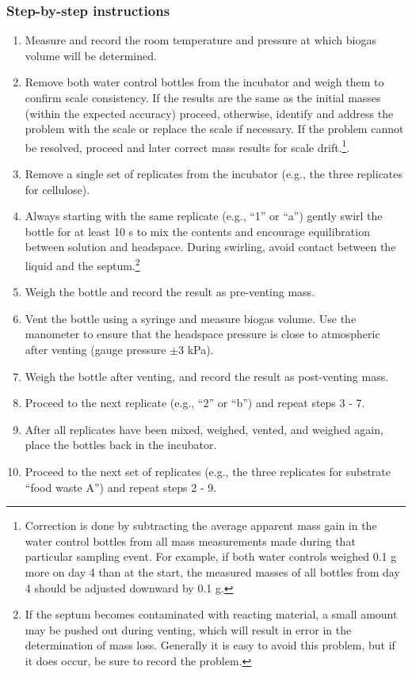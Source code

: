 \documentclass[]{article}
\begin{document}
\subsubsection{Step-by-step instructions}
\begin{enumerate}
    \item Measure and record the room temperature and pressure at which biogas volume will be determined.
    \item Remove both water control bottles from the incubator and weigh them to confirm scale consistency. 
      If the results are the same as the initial masses (within the expected accuracy) proceed, otherwise, identify and address the problem with the scale or replace the scale if necessary.
      If the problem cannot be resolved, proceed and later correct mass results for scale drift.\footnote{
        Correction is done by subtracting the average apparent mass gain in the water control bottles from all mass measurements made during that particular sampling event. 
        For example, if both water controls weighed 0.1 g more on day 4 than at the start, the measured masses of all bottles from day 4 should be adjusted downward by 0.1 g.
      }.
    \item Remove a single set of replicates from the incubator (e.g., the three replicates for cellulose).
    \item Always starting with the same replicate (e.g., ``1'' or ``a'') gently swirl the bottle for at least 10 s to mix the contents and encourage  equilibration between solution and headspace. 
      During swirling, avoid contact between the liquid and the septum.\footnote{
        If the septum becomes contaminated with reacting material, a small amount may be pushed out during venting, which will result in error in the determination of mass loss.
        Generally it is easy to avoid this problem, but if it does occur, be sure to record the problem.
      }
    \item Weigh the bottle and record the result as pre-venting mass.
    \item Vent the bottle using a syringe and measure biogas volume.
      Use the manometer to ensure that the headspace pressure is close to atmospheric after venting (gauge pressure $\pm3$ kPa).
    \item Weigh the bottle after venting, and record the result as post-venting mass. 
    \item Proceed to the next replicate (e.g., ``2'' or ``b'') and repeat steps 3 - 7.
    \item After all replicates have been mixed, weighed, vented, and weighed again, place the bottles back in the incubator.
    \item Proceed to the next set of replicates (e.g., the three replicates for substrate ``food waste A'') and repeat steps 2 - 9.
\end{enumerate}


\end{document}
